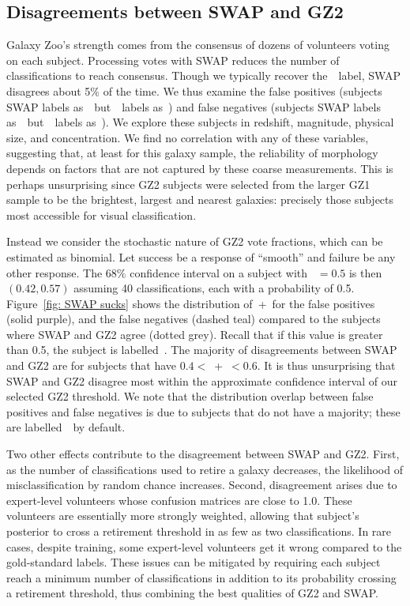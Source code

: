 \subsection{Disagreements between SWAP and GZ2}\label{sec: swap gz2 disagree}

Galaxy Zoo's strength comes from the consensus of dozens of volunteers voting on each subject. 
Processing votes with SWAP reduces the number of classifications to reach consensus. 
Though we typically recover the~\raw~label, SWAP disagrees about 5\% of the time. 
We thus examine the false positives (subjects SWAP labels as~\feat~but~\raw~labels as~\notfeat) and false negatives (subjects SWAP labels as~\notfeat~but~\raw~labels as~\feat).
We explore these subjects in redshift, magnitude, physical size, and concentration. We find no correlation with any of these variables, suggesting that, at least for this galaxy sample, the reliability of morphology depends on factors that are not captured by these coarse measurements.
This is perhaps unsurprising since GZ2 subjects were selected from the larger GZ1 sample to be the brightest, largest and nearest galaxies:  precisely those subjects most accessible for visual classification. 

Instead we consider the stochastic nature of GZ2 vote fractions, which can be estimated as binomial. Let success be a response of ``smooth'' and failure be any other response. The $68\%$ confidence interval on a subject with \fsmooth~$=0.5$ is then $(0.42, 0.57)$ assuming 40 classifications, each with a probability of 0.5.
Figure~\ref{fig: SWAP sucks} shows the distribution of~\ffeat+\fstar~for the false positives (solid purple), and the false negatives (dashed teal) compared to the
 subjects where SWAP and GZ2 agree (dotted grey).  
Recall that if this value is greater than 0.5, the subject is labelled~\feat.  
The majority of disagreements between SWAP and GZ2 are for 
subjects that have $0.4 <$~\ffeat+\fstar~$< 0.6$. It is thus unsurprising that SWAP and GZ2 disagree most within the approximate confidence interval of our selected GZ2 threshold.
We note that the distribution overlap between false positives and false negatives is due to subjects that do not have a majority;
these are labelled~\notfeat~by default. 


Two other effects contribute to the disagreement between SWAP and GZ2. 
First, as the number of classifications used to retire a galaxy decreases, the 
likelihood of misclassification by random chance increases. 
Second, disagreement arises due to expert-level volunteers whose confusion 
matrices are close to 1.0. These volunteers are essentially more 
strongly weighted, allowing that subject's posterior to cross a retirement threshold
in as few as two classifications. In rare cases, despite training, some expert-level 
volunteers get it wrong compared to the gold-standard labels. These issues can be mitigated by requiring each subject reach 
a minimum number of classifications in addition to its probability crossing a
retirement threshold, thus combining the best qualities of GZ2 and SWAP. 


